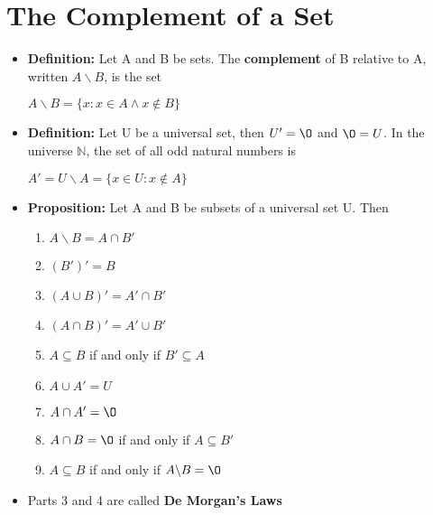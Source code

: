 \documentclass{report}
\begin{document}
	\section{The Complement of a Set}
		\begin{itemize}\addtolength{\leftskip}{2em}
			\item \textbf{Definition:} Let A and B be sets. The \textbf{complement} of B relative to A, written $A\backslash B$, is the set
			\begin{center}
			$A\backslash B=\{x:x\in A \wedge x \notin B\}$
			\end{center}
			\item \textbf{Definition:} Let U be a universal set, then $U'=\O$ and $\O=U$. In the universe $\mathbb{N}$, the set of all odd natural numbers is 
			\begin{center}
			$A'=U\backslash A=\{x\in U:x\notin A\}$
			\end{center}
			\item \textbf{Proposition:} Let A and B be subsets of a universal set U. Then
			\begin{enumerate}\addtolength{\leftskip}{4em}
				\item $A\backslash B=A\cap B'$
				\item $(B')'=B$
				\item $(A\cup B)'=A'\cap B'$
				\item $(A\cap B)'=A'\cup B'$
				\item $A\subseteq B$ if and only if $B'\subseteq A$
				\item $A\cup A'=U$
				\item $A\cap A'=\O$
				\item $A\cap B=\O$ if and only if $A\subseteq B'$
				\item $A\subseteq B$ if and only if $A\backslash B=\O$
			\end{enumerate}
			\item Parts 3 and 4 are called \textbf{De Morgan's Laws}
		\end{itemize}
\end{document}

